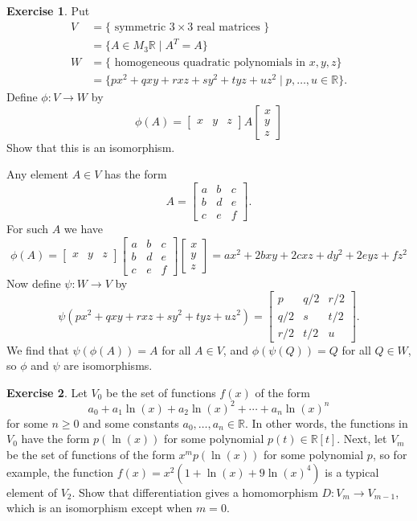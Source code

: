 \documentclass[a4paper]{amsart}
\newcommand{\R}         {{\mathbb{R}}}
\newcommand{\bpm}       {\left[\begin{matrix}}
\newcommand{\epm}       {\end{matrix}\right]}
\newcommand{\tm}        {\times}
\newcommand{\st}        {\;|\;}
\renewcommand{\:}{\colon}
\theoremstyle{definition}
\newtheorem{exercise}{Exercise}
\newenvironment{solution}{{\noindent \bf Solution:}}{}
\begin{document}
\begin{exercise}
 Put 
 \begin{align*}
  V &= \{\text{ symmetric $3\tm 3$ real matrices }\}  \\
    &= \{A\in M_3\R\st A^T=A\} \\
  W &= \{\text{ homogeneous quadratic polynomials in $x,y,z$}\} \\
    &= \{px^2+qxy+rxz+sy^2+tyz+uz^2\st p,\dotsc,u\in\R\}.
 \end{align*}
 Define $\phi\:V\to W$ by 
 \[ \phi(A) = \bpm x & y & z \epm A
              \bpm x \\ y \\ z \epm 
 \]
 Show that this is an isomorphism.
\end{exercise}
\begin{solution}
 Any element $A\in V$ has the form 
 \[ A = \bpm a & b & c \\ b & d & e \\ c & e & f \epm. \]
 For such $A$ we have 
 \[ \phi(A) = 
     \bpm x & y & z \epm 
     \bpm a & b & c \\ b & d & e \\ c & e & f \epm
     \bpm x \\ y \\ z \epm = 
     ax^2+2bxy+2cxz+dy^2+2eyz+fz^2    
 \]
 Now define $\psi\:W\to V$ by 
 \[ \psi(px^2+qxy+rxz+sy^2+tyz+uz^2) =
   \bpm p   & q/2 & r/2 \\
        q/2 & s   & t/2 \\
        r/2 & t/2 & u      \epm.
 \]
 We find that $\psi(\phi(A))=A$ for all $A\in V$, and
 $\phi(\psi(Q))=Q$ for all $Q\in W$, so $\phi$ and $\psi$ are 
 isomorphisms.
\end{solution}

\begin{exercise}
 Let $V_0$ be the set of functions $f(x)$ of the form
 \[ a_0 + a_1\ln(x) + a_2\ln(x)^2 + \dotsb + a_n\ln(x)^n \]
 for some $n\geq 0$ and some constants $a_0,\dotsc,a_n\in\R$.
 In other words, the functions in $V_0$ have the form $p(\ln(x))$ 
 for some polynomial $p(t)\in\R[t]$.  Next, let $V_m$ be the set 
 of functions of the form $x^mp(\ln(x))$ for some polynomial $p$,
 so for example, the function $f(x)=x^2(1+\ln(x)+9\ln(x)^4)$ is
 a typical element of $V_2$.  Show that differentiation gives a
 homomorphism $D\:V_m\to V_{m-1}$, which is an isomorphism except
 when $m=0$. 
\end{exercise}
\begin{solution}
 
\end{solution}
\end{document}
